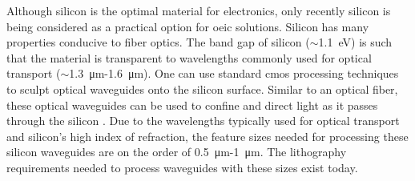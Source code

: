 \documentclass[../report.tex]{subfiles}
\begin{document}
Although silicon is the optimal material for electronics, only recently silicon is being considered as a practical option for \gls{oeic} solutions. Silicon has many properties conducive to fiber optics. The band gap of silicon ($\sim$\SI{1.1}{\electronvolt}) is such that the material is transparent to wavelengths commonly used for optical transport ($\sim$\SI{1.3}{\micro\metre}-\SI{1.6}{\micro\metre}). One can use standard \gls{cmos} processing techniques to sculpt optical waveguides onto the silicon surface. Similar to an optical fiber, these optical waveguides can be used to confine and direct light as it passes through the silicon \cite{reed_silicon_2004}. Due to the wavelengths typically used for optical transport and silicon’s high index of refraction, the feature sizes needed for processing these silicon waveguides are on the order of \SI{0.5}{\micro\metre}-\SI{1}{\micro\metre}. The lithography requirements needed to process waveguides with these sizes exist today. %
	
\end{document}
